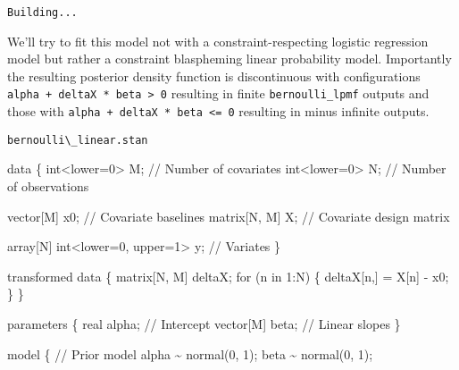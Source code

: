 \documentclass[
  letterpaper,
  DIV=11,
  numbers=noendperiod]{scrartcl}
\newenvironment{Shaded}{\begin{snugshade}}{\end{snugshade}}
\newcommand{\CommentTok}[1]{\textcolor[rgb]{0.37,0.37,0.37}{#1}}
\newcommand{\ControlFlowTok}[1]{\textcolor[rgb]{0.00,0.23,0.31}{#1}}
\newcommand{\DataTypeTok}[1]{\textcolor[rgb]{0.68,0.00,0.00}{#1}}
\newcommand{\DecValTok}[1]{\textcolor[rgb]{0.68,0.00,0.00}{#1}}
\newcommand{\KeywordTok}[1]{\textcolor[rgb]{0.00,0.23,0.31}{#1}}
\newcommand{\NormalTok}[1]{\textcolor[rgb]{0.00,0.23,0.31}{#1}}
\begin{document}
\begin{verbatim}
Building...
\end{verbatim}

We'll try to fit this model not with a constraint-respecting logistic
regression model but rather a constraint blaspheming linear probability
model. Importantly the resulting posterior density function is
discontinuous with configurations
\texttt{alpha\ +\ deltaX\ *\ beta\ \textgreater{}\ 0} resulting in
finite \texttt{bernoulli\_lpmf} outputs and those with
\texttt{alpha\ +\ deltaX\ *\ beta\ \textless{}=\ 0} resulting in minus
infinite outputs.

\begin{codelisting}

\caption{\texttt{bernoulli\textbackslash\_linear.stan}}

\begin{Shaded}
\begin{Highlighting}[]
\KeywordTok{data}\NormalTok{ \{}
  \DataTypeTok{int}\NormalTok{\textless{}}\KeywordTok{lower}\NormalTok{=}\DecValTok{0}\NormalTok{\textgreater{} M; }\CommentTok{// Number of covariates}
  \DataTypeTok{int}\NormalTok{\textless{}}\KeywordTok{lower}\NormalTok{=}\DecValTok{0}\NormalTok{\textgreater{} N; }\CommentTok{// Number of observations}
  
  \DataTypeTok{vector}\NormalTok{[M] x0;   }\CommentTok{// Covariate baselines}
  \DataTypeTok{matrix}\NormalTok{[N, M] X; }\CommentTok{// Covariate design matrix}
  
  \DataTypeTok{array}\NormalTok{[N] }\DataTypeTok{int}\NormalTok{\textless{}}\KeywordTok{lower}\NormalTok{=}\DecValTok{0}\NormalTok{, }\KeywordTok{upper}\NormalTok{=}\DecValTok{1}\NormalTok{\textgreater{} y; }\CommentTok{// Variates}
\NormalTok{\}}

\KeywordTok{transformed data}\NormalTok{ \{}
  \DataTypeTok{matrix}\NormalTok{[N, M] deltaX;}
  \ControlFlowTok{for}\NormalTok{ (n }\ControlFlowTok{in} \DecValTok{1}\NormalTok{:N) \{}
\NormalTok{    deltaX[n,] = X[n] {-} x0\textquotesingle{};}
\NormalTok{  \}}
\NormalTok{\}}

\KeywordTok{parameters}\NormalTok{ \{}
  \DataTypeTok{real}\NormalTok{ alpha;      }\CommentTok{// Intercept}
  \DataTypeTok{vector}\NormalTok{[M] beta;  }\CommentTok{// Linear slopes}
\NormalTok{\}}

\KeywordTok{model}\NormalTok{ \{}
  \CommentTok{// Prior model}
\NormalTok{  alpha \textasciitilde{} normal(}\DecValTok{0}\NormalTok{, }\DecValTok{1}\NormalTok{);}
\NormalTok{  beta \textasciitilde{} normal(}\DecValTok{0}\NormalTok{, }\DecValTok{1}\NormalTok{);}


\end{Highlighting}
\end{Shaded}
\end{codelisting}
\end{document}
